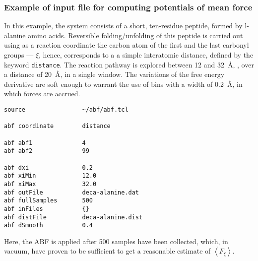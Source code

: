 \subsubsection{Example of input file for computing potentials of mean force}


In this example,
the system consists of a short,
ten-residue peptide, formed by {\sc l}-alanine amino acids.
Reversible folding/unfolding of
this peptide is carried out using as a reaction coordinate the carbon
atom of the first and the last carbonyl groups --- $\xi$, hence,
corresponds to a a simple interatomic distance, defined by the
keyword {\tt distance}. The reaction pathway is explored between
12 and 32~\AA, \ie, over a distance of 20~\AA, in a single window.
The variations of the free energy derivative are soft enough to warrant
the use of bins with a width of 0.2~\AA, in which forces are accrued.


\begin{verbatim}
source                ~/abf/abf.tcl

abf coordinate        distance

abf abf1              4
abf abf2              99

abf dxi               0.2
abf xiMin             12.0
abf xiMax             32.0
abf outFile           deca-alanine.dat
abf fullSamples       500
abf inFiles           {}
abf distFile          deca-alanine.dist
abf dSmooth           0.4
\end{verbatim}


Here, the ABF is applied after 500 samples have been
collected, which, in vacuum, have proven to be sufficient
to get a reasonable estimate of $\left\langle F_\xi \right\rangle$.

